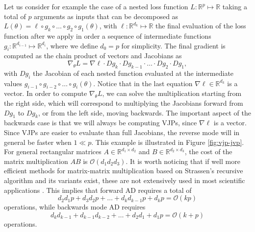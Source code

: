 Let us consider for example the case of a nested loss function $L : \mathbb R^p \mapsto \mathbb R$ taking a total of $p$ arguments as inputs that can be decomposed as $L(\theta) = \ell \circ g_{k} \circ \ldots \circ g_2 \circ g_1(\theta)$, with $\ell : \mathbb R^{d_k} \mapsto \mathbb R$ the final evaluation of the loss function after we apply in order a sequence of intermediate functions $g_i : \mathbb R^{d_{i-1}} \mapsto \mathbb R^{d_i}$, where we define $d_0 = p$ for simplicity. 
The final gradient is computed as the chain product of vectors and Jacobians as
\begin{equation}
 \nabla_\theta L = \nabla \ell \cdot Dg_{k} \cdot Dg_{k-1} \cdot \ldots \cdot Dg_2 \cdot Dg_1, 
\end{equation}
with $Dg_i$ the Jacobian of each nested function evaluated at the intermediate values $g_{i-1} \circ g_{i-2} \circ \ldots \circ g_i (\theta)$.
Notice that in the last equation $\nabla \ell \in \mathbb R^{d_k}$ is a vector.
In order to compute $\nabla_\theta L$, we can solve the multiplication starting from the right side, which will correspond to multiplying the Jacobians forward from $Dg_1$ to $Dg_k$, or from the left side, moving backwards. 
The important aspect of the backwards case is that we will always be computing VJPs, since $\nabla \ell$ is a vector.
Since VJPs are easier to evaluate than full Jacobians, the reverse mode will in general be faster when $1 \ll p$.
This example is illustrated in Figure \ref{fig:vjp-jvp}. 
For general rectangular matrices $A\in \mathbb R^{d_1 \times d_2}$ and $B \in \mathbb R^{d_2 \times d_3}$, the cost of the matrix multiplication $AB$ is $\mathcal O (d_1 d_2 d_3)$.
It is worth noticing that if well more efficient methods for matrix-matrix multiplication based on Strassen’s recursive algorithm and its variants exist, these are not extensively used in most scientific applications \cite{Silva_Gustafson_Wong_2018, Huang_Smith_Henry_Geijn_2016}.
This implies that forward AD requires a total of
\begin{equation}
 d_2 d_1 p + d_3 d_2 p + \ldots + d_k d_{k-1} p + d_k p = \mathcal O (kp)
\end{equation}
operations, while backwards mode AD requires
\begin{equation}
 d_k d_{k-1} + d_{k-1} d_{k-2} + \ldots + d_2 d_1 + d_1 p = \mathcal O (k+p)
\end{equation}
operations. 

